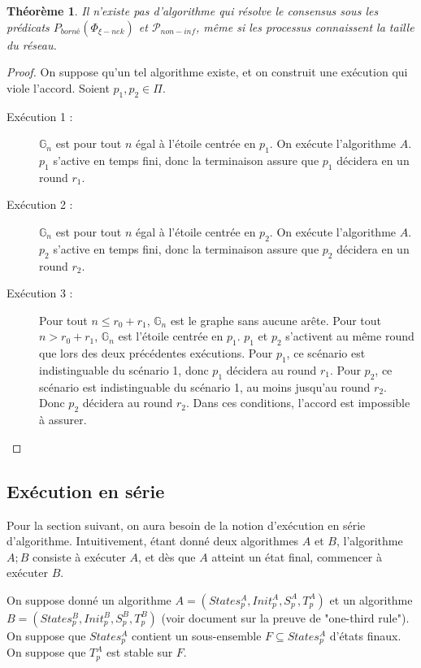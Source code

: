 \documentclass{article}
\newtheorem{theorem}{Théorème}
\begin{document}
\begin{theorem}
	Il n'existe pas d'algorithme qui résolve le consensus sous les prédicats $P_{borné}(\Phi_{\xi-nek})$ et $\mathcal{P}_{non-inf}$, même si les processus connaissent la taille du réseau.
\end{theorem}
\begin{proof}
	On suppose qu'un tel algorithme existe, et on construit une exécution qui viole l'accord.
	Soient $p_1, p_2 \in \Pi$.
	\begin{description}

		\item[Exécution 1 :] $\mathds{G}_n$ est pour tout $n$ égal à l'étoile centrée en $p_1$. On exécute l'algorithme $A$.
			$p_1$ s'active en temps fini, donc la terminaison assure que $p_1$ décidera en un round $r_1$.
		\item[Exécution 2 :] $\mathds{G}_n$ est pour tout $n$ égal à l'étoile centrée en $p_2$. On exécute l'algorithme $A$.
			$p_2$ s'active en temps fini, donc la terminaison assure que $p_2$ décidera en un round $r_2$.
		\item[Exécution 3 :] Pour tout $n \leq r_0 + r_1$, $\mathds{G}_n$ est le graphe sans aucune arête. Pour tout $n > r_0 + r_1$, $\mathds{G}_n$ est l'étoile centrée en $p_1$.
			$p_1$ et $p_2$ s'activent au même round que lors des deux précédentes exécutions.
			Pour $p_1$, ce scénario est indistinguable du scénario 1, donc $p_1$ décidera au round $r_1$.
			Pour $p_2$, ce scénario est indistinguable du scénario 1, au moins jusqu'au round $r_2$. Donc $p_2$ décidera au round $r_2$.
			Dans ces conditions, l'accord est impossible à assurer.

	\end{description}
\end{proof}

\subsection{Exécution en série}

Pour la section suivant, on aura besoin de la notion d'exécution en série d'algorithme.
Intuitivement, étant donné deux algorithmes $A$ et $B$, l'algorithme $A;B$ consiste à exécuter $A$, et dès que $A$ atteint un état final, commencer à exécuter $B$.

On suppose donné un algorithme $A = (States_p^A, Init_p^A, S_p^A, T_p^A)$ et un algorithme $B = (States_p^B, Init_p^B, S_p^B, T_p^B)$ (voir document sur la preuve de "one-third rule").
On suppose que $States_p^A$ contient un sous-ensemble $F \subseteq States_p^A$ d'états finaux. On suppose que $T_p^A$ est stable sur $F$.
\end{document}
